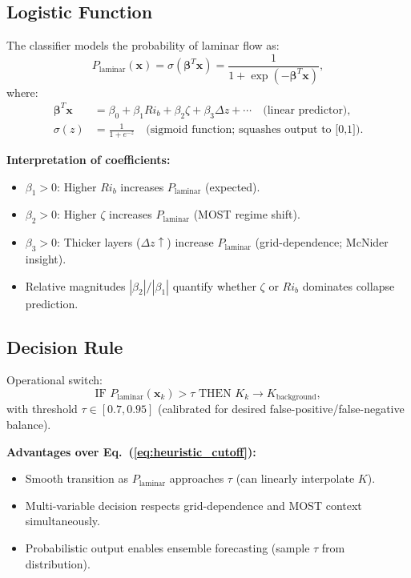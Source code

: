 \documentclass[11pt]{article}
\begin{document}
\subsection{Logistic Function}

The classifier models the probability of laminar flow as:
\begin{equation}
P_{\text{laminar}}(\mathbf{x}) = \sigma(\boldsymbol{\beta}^T \mathbf{x}) = \frac{1}{1 + \exp(-\boldsymbol{\beta}^T \mathbf{x})},
\label{eq:logistic_function}
\end{equation}
where:
\begin{align}
\boldsymbol{\beta}^T \mathbf{x} &= \beta_0 + \beta_1 Ri_b + \beta_2 \zeta + \beta_3 \Delta z + \cdots \quad \text{(linear predictor)}, \label{eq:linear_predictor} \\
\sigma(z) &= \frac{1}{1+e^{-z}} \quad \text{(sigmoid function; squashes output to [0,1])}. \label{eq:sigmoid}
\end{align}

\textbf{Interpretation of coefficients:}
\begin{itemize}[leftmargin=*]
\item $\beta_1 > 0$: Higher $Ri_b$ increases $P_{\text{laminar}}$ (expected).
\item $\beta_2 > 0$: Higher $\zeta$ increases $P_{\text{laminar}}$ (MOST regime shift).
\item $\beta_3 > 0$: Thicker layers ($\Delta z \uparrow$) increase $P_{\text{laminar}}$ (grid-dependence; McNider insight).
\item Relative magnitudes $|\beta_2|/|\beta_1|$ quantify whether $\zeta$ or $Ri_b$ dominates collapse prediction.
\end{itemize}

\subsection{Decision Rule}

Operational switch:
\begin{equation}
\text{IF } P_{\text{laminar}}(\mathbf{x}_k) > \tau \text{ THEN } K_k \to K_{\text{background}},
\label{eq:decision_rule}
\end{equation}
with threshold $\tau \in [0.7, 0.95]$ (calibrated for desired false-positive/false-negative balance).

\textbf{Advantages over Eq.~(\ref{eq:heuristic_cutoff}):}
\begin{itemize}[leftmargin=*]
\item Smooth transition as $P_{\text{laminar}}$ approaches $\tau$ (can linearly interpolate $K$).
\item Multi-variable decision respects grid-dependence and MOST context simultaneously.
\item Probabilistic output enables ensemble forecasting (sample $\tau$ from distribution).
\end{itemize}
\end{document}

